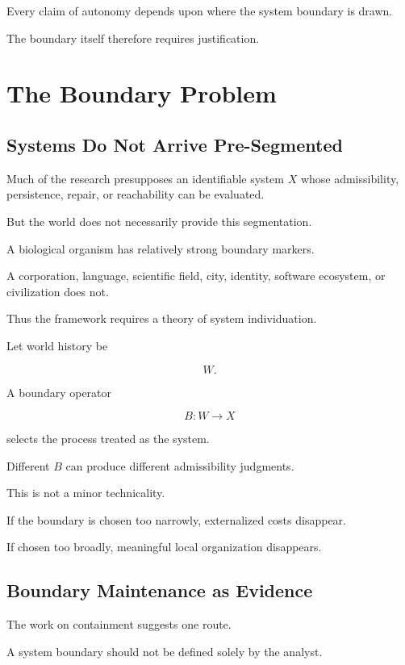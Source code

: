 \documentclass[11pt]{article}
\theoremstyle{remark}
\begin{document}
Every claim of autonomy depends upon where the system boundary is drawn.

The boundary itself therefore requires justification.

\section{The Boundary Problem}

\subsection{Systems Do Not Arrive Pre-Segmented}

Much of the research presupposes an identifiable system $X$ whose admissibility, persistence, repair, or reachability can be evaluated.

But the world does not necessarily provide this segmentation.

A biological organism has relatively strong boundary markers.

A corporation, language, scientific field, city, identity, software ecosystem, or civilization does not.

Thus the framework requires a theory of system individuation.

Let world history be

\begin{equation}
W.
\end{equation}

A boundary operator

\begin{equation}
B:W\rightarrow X
\end{equation}

selects the process treated as the system.

Different $B$ can produce different admissibility judgments.

This is not a minor technicality.

If the boundary is chosen too narrowly, externalized costs disappear.

If chosen too broadly, meaningful local organization disappears.

\subsection{Boundary Maintenance as Evidence}

The work on containment suggests one route.

A system boundary should not be defined solely by the analyst.
\end{document}
